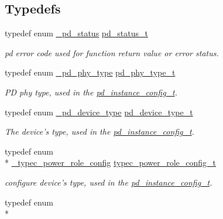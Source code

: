 \subsection*{Typedefs}
\begin{DoxyCompactItemize}
\item 
typedef enum \hyperlink{group__usb__pd__stack_gaaad4cd00dd02567c6169429e3a895073}{\-\_\-pd\-\_\-status} \hyperlink{group__usb__pd__stack_ga04a1f331d9807a70ab9bb753f5ed1c80}{pd\-\_\-status\-\_\-t}
\begin{DoxyCompactList}\small\item\em pd error code used for function return value or error status. \end{DoxyCompactList}\item 
typedef enum \hyperlink{group__usb__pd__stack_ga8bd01601105e164bc0e0bb538aaa5c1c}{\-\_\-pd\-\_\-phy\-\_\-type} \hyperlink{group__usb__pd__stack_gaafe9b09173bbffaa5075085b0dab18ec}{pd\-\_\-phy\-\_\-type\-\_\-t}
\begin{DoxyCompactList}\small\item\em P\-D phy type, used in the \hyperlink{group__usb__pd__stack_gafa6034f9e204836697da1f2fc996cbad}{pd\-\_\-instance\-\_\-config\-\_\-t}. \end{DoxyCompactList}\item 
typedef enum \hyperlink{group__usb__pd__stack_ga922338772b41ceba51f7881c74b9e20a}{\-\_\-pd\-\_\-device\-\_\-type} \hyperlink{group__usb__pd__stack_gac70b6cd09eeb45ce1aeaa279f44adbc7}{pd\-\_\-device\-\_\-type\-\_\-t}
\begin{DoxyCompactList}\small\item\em The device's type, used in the \hyperlink{group__usb__pd__stack_gafa6034f9e204836697da1f2fc996cbad}{pd\-\_\-instance\-\_\-config\-\_\-t}. \end{DoxyCompactList}\item 
typedef enum \\*
\hyperlink{group__usb__pd__stack_gaffef947540aace08ecf6fd25f69720a9}{\-\_\-typec\-\_\-power\-\_\-role\-\_\-config} \hyperlink{group__usb__pd__stack_ga8522facb45d87054c87e6d6fb32d9dd1}{typec\-\_\-power\-\_\-role\-\_\-config\-\_\-t}
\begin{DoxyCompactList}\small\item\em configure device's type, used in the \hyperlink{group__usb__pd__stack_gafa6034f9e204836697da1f2fc996cbad}{pd\-\_\-instance\-\_\-config\-\_\-t}. \end{DoxyCompactList}\item 
typedef enum \\*

\end{DoxyCompactItemize}
